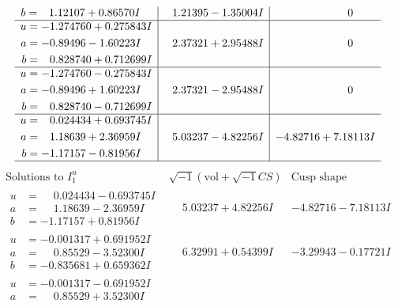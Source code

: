 \documentclass[1p]{elsarticle_modified}
\theoremstyle{definition}
\newcommand{\I}{\sqrt{-1}}
\begin{document}
$$\begin{array}{c|c|c}
\begin{aligned}
b &= \phantom{-}1.12107 + 0.86570 I\end{aligned}
 & \phantom{-}1.21395 - 1.35004 I & \phantom{-0.000000 } 0 \\ \hline\begin{aligned}
u &= -1.274760 + 0.275843 I \\
a &= -0.89496 - 1.60223 I \\
b &= \phantom{-}0.828740 + 0.712699 I\end{aligned}
 & \phantom{-}2.37321 + 2.95488 I & \phantom{-0.000000 } 0 \\ \hline\begin{aligned}
u &= -1.274760 - 0.275843 I \\
a &= -0.89496 + 1.60223 I \\
b &= \phantom{-}0.828740 - 0.712699 I\end{aligned}
 & \phantom{-}2.37321 - 2.95488 I & \phantom{-0.000000 } 0 \\ \hline\begin{aligned}
u &= \phantom{-}0.024434 + 0.693745 I \\
a &= \phantom{-}1.18639 + 2.36959 I \\
b &= -1.17157 - 0.81956 I\end{aligned}
 & \phantom{-}5.03237 - 4.82256 I & -4.82716 + 7.18113 I\\
 \hline 
 \end{array}$$\newpage$$\begin{array}{c|c|c}  
\text{Solutions to }I^u_{1}& \I (\text{vol} + \sqrt{-1}CS) & \text{Cusp shape}\\
 \hline 
\begin{aligned}
u &= \phantom{-}0.024434 - 0.693745 I \\
a &= \phantom{-}1.18639 - 2.36959 I \\
b &= -1.17157 + 0.81956 I\end{aligned}
 & \phantom{-}5.03237 + 4.82256 I & -4.82716 - 7.18113 I \\ \hline\begin{aligned}
u &= -0.001317 + 0.691952 I \\
a &= \phantom{-}0.85529 - 3.52300 I \\
b &= -0.835681 + 0.659362 I\end{aligned}
 & \phantom{-}6.32991 + 0.54399 I & -3.29943 - 0.17721 I \\ \hline\begin{aligned}
u &= -0.001317 - 0.691952 I \\
a &= \phantom{-}0.85529 + 3.52300 I \\

\end{aligned}
\end{array}$$
\end{document}
